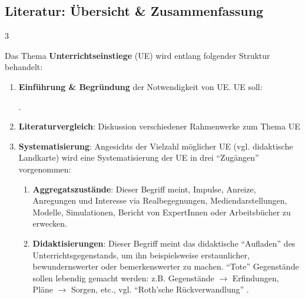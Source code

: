 \thispagestyle{empty}
\begin{landscape}
  \begin{center}
    \section*{Literatur: Übersicht \& Zusammenfassung}
  \end{center}
  \footnotesize
  \begin{multicols*}{3}
    \begin{myBox}[title=\enquote{Unterrichtsplanung und Methoden} \cite{kaiser}]
      Das Thema \textbf{Unterrichtseinstiege} (UE) wird entlang folgender Struktur behandelt:
      \begin{enumerate}
        \item \textbf{Einführung \& Begründung} der Notwendigkeit von UE. UE soll:
              .
        \item \textbf{Literaturvergleich}: Diskussion verschiedener Rahmenwerke zum Thema UE
        \item \textbf{Systematisierung}: Angesichts der Vielzahl möglicher UE (vgl. didaktische Landkarte) wird eine Systematisierung der UE in drei \enquote{Zugängen} vorgenommen:
              \begin{enumerate}
                \item \textbf{Aggregatszustände}: Dieser Begriff meint, Impulse, Anreize, Anregungen und Interesse via Realbegegnungen, Mediendarstellungen, Modelle, Simulationen, Bericht von ExpertInnen oder Arbeitsbücher zu erwecken.
                \item \textbf{Didaktisierungen}: Dieser Begriff meint das didaktische \enquote{Aufladen} des Unterrichtsgegenstands, um ihn beispielsweise erstaunlicher, bewundernswerter oder bemerkenswerter zu machen. \enquote{Tote} Gegenstände sollen lebendig gemacht werden: z.B. Gegenstände $\rightarrow$ Erfindungen, Pläne $\rightarrow$ Sorgen, etc., vgl.  \enquote{Roth'sche Rückverwandlung} \cite{roth}.

\end{enumerate}
\end{enumerate}
\end{myBox}
\end{multicols*}
\end{landscape}
